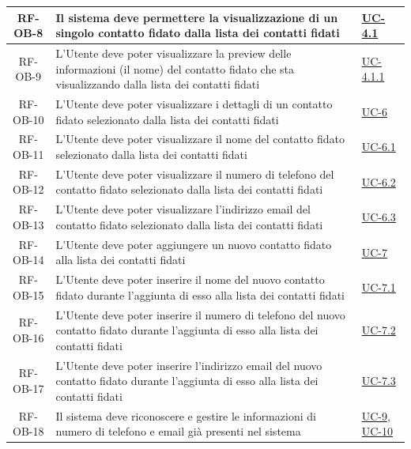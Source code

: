 \documentclass[a4paper,12pt]{article}
\begin{document}
\begin{center}
\begin{longtable}{|c|p{8.5cm}|>{\centering\arraybackslash}p{4cm}|}
RF-OB-8 & Il sistema deve permettere la visualizzazione di un singolo contatto fidato dalla lista dei contatti fidati & \hyperref[subsec:UC-4.1]{UC-4.1} \\
\hline

RF-OB-9 & L'Utente deve poter visualizzare la preview delle informazioni (il nome) del contatto fidato che sta visualizzando dalla lista dei contatti fidati & \hyperref[subsec:UC-4.1.1]{UC-4.1.1} \\
\hline

RF-OB-10 & L'Utente deve poter visualizzare i dettagli di un contatto fidato selezionato dalla lista dei contatti fidati & \hyperref[subsec:UC-6]{UC-6} \\
\hline

RF-OB-11 & L'Utente deve poter visualizzare il nome del contatto fidato selezionato dalla lista dei contatti fidati & \hyperref[subsec:UC-6.1]{UC-6.1} \\
\hline

RF-OB-12 & L'Utente deve poter visualizzare il numero di telefono del contatto fidato selezionato dalla lista dei contatti fidati & \hyperref[subsec:UC-6.2]{UC-6.2} \\
\hline

RF-OB-13 & L'Utente deve poter visualizzare l'indirizzo email del contatto fidato selezionato dalla lista dei contatti fidati & \hyperref[subsec:UC-6.3]{UC-6.3} \\
\hline

RF-OB-14 & L'Utente deve poter aggiungere un nuovo contatto fidato alla lista dei contatti fidati & \hyperref[subsec:UC-7]{UC-7} \\
\hline

RF-OB-15 & L'Utente deve poter inserire il nome del nuovo contatto fidato durante l'aggiunta di esso alla lista dei contatti fidati & \hyperref[subsec:UC-7.1]{UC-7.1} \\
\hline

RF-OB-16 & L'Utente deve poter inserire il numero di telefono del nuovo contatto fidato durante l'aggiunta di esso alla lista dei contatti fidati & \hyperref[subsec:UC-7.2]{UC-7.2} \\
\hline

RF-OB-17 & L'Utente deve poter inserire l'indirizzo email del nuovo contatto fidato durante l'aggiunta di esso alla lista dei contatti fidati & \hyperref[subsec:UC-7.3]{UC-7.3} \\
\hline

RF-OB-18 & Il sistema deve riconoscere e gestire le informazioni di numero di telefono e email già presenti nel sistema & \hyperref[subsec:UC-9]{UC-9}, \hyperref[subsec:UC-10]{UC-10} \\
\hline


\end{longtable}
\end{center}
\end{document}
